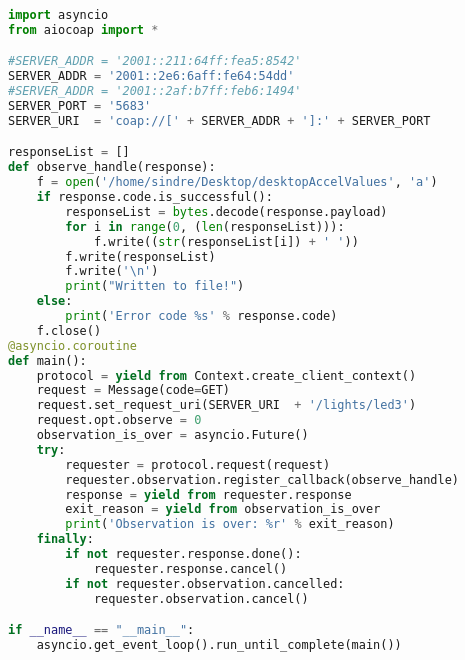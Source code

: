 \begin{lstlisting}[language=Python]
import asyncio
from aiocoap import *

#SERVER_ADDR = '2001::211:64ff:fea5:8542'
SERVER_ADDR = '2001::2e6:6aff:fe64:54dd'
#SERVER_ADDR = '2001::2af:b7ff:feb6:1494'
SERVER_PORT = '5683'
SERVER_URI  = 'coap://[' + SERVER_ADDR + ']:' + SERVER_PORT

responseList = []
def observe_handle(response):
	f = open('/home/sindre/Desktop/desktopAccelValues', 'a')
	if response.code.is_successful(): 	
		responseList = bytes.decode(response.payload) 
		for i in range(0, (len(responseList))):
			f.write((str(responseList[i]) + ' '))
		f.write(responseList)		
		f.write('\n')
		print("Written to file!")
	else:
		print('Error code %s' % response.code)
	f.close()
@asyncio.coroutine
def main():
    protocol = yield from Context.create_client_context()
    request = Message(code=GET)
    request.set_request_uri(SERVER_URI  + '/lights/led3')
    request.opt.observe = 0
    observation_is_over = asyncio.Future()
    try:
        requester = protocol.request(request)
        requester.observation.register_callback(observe_handle)
        response = yield from requester.response
        exit_reason = yield from observation_is_over
        print('Observation is over: %r' % exit_reason)
    finally:
        if not requester.response.done():
            requester.response.cancel()
        if not requester.observation.cancelled:
            requester.observation.cancel()

if __name__ == "__main__":
    asyncio.get_event_loop().run_until_complete(main())


\end{lstlisting}

